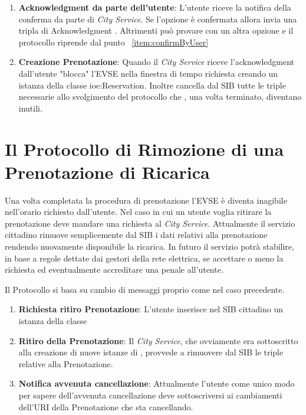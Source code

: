 \begin{enumerate}[label=\textbf{\arabic*}]
	\\ . 
	\item \textbf{Acknowledgment da parte dell'utente}: L'utente riceve la notifica della conferma da parte di \emph{City Service}. Se l'opzione è confermata allora invia una tripla di Acknowledgment . Altrimenti può provare con un altra opzione e il protocollo riprende dal punto ~\ref{item:confirmByUser}
	\item \textbf{Creazione Prenotazione}: Quando il \emph{City Service} riceve l'acknowledgment dall'utente "blocca" l'EVSE nella finestra di tempo richiesta creando un istanza della classe {ioe:Reservation}. Inoltre cancella dal SIB tutte le triple necessarie allo svolgimento del protocollo che  , una volta terminato, diventano inutili.
\end{enumerate}

\section{Il Protocollo di Rimozione di una Prenotazione di Ricarica}

Una volta completata la procedura di prenotazione l'EVSE è diventa inagibile nell'orario richiesto dall'utente. Nel caso in cui un utente voglia ritirare la prenotazione deve mandare una richiesta al \emph{City Service}. Attualmente il servizio cittadino rimuove semplicemente dal SIB i dati relativi alla prenotazione rendendo nuovamente disponibile la ricarica. In futuro il servizio potrà stabilire, in base a regole dettate dai gestori della rete elettrica, se accettare o meno la richiesta ed eventualmente accreditare una penale all'utente.

Il Protocollo si basa su cambio di messaggi proprio come nel caso precedente.

\begin{enumerate}
	\item \textbf{Richiesta ritiro Prenotazione}: L'utente inserisce nel SIB cittadino un istanza della classe  
	\item \textbf{Ritiro della Prenotazione}: Il \emph{City Service}, che ovviamente era sottoscritto alla creazione di nuove istanze di , provvede a rimuovere dal SIB le triple relative alla Prenotazione.
	\item \textbf{Notifica avvenuta cancellazione}: Attualmente l'utente come unico modo per sapere dell'avvenuta cancellazione deve sottoscriversi ai cambiamenti dell'URI della Prenotazione che sta cancellando.
\end{enumerate}

